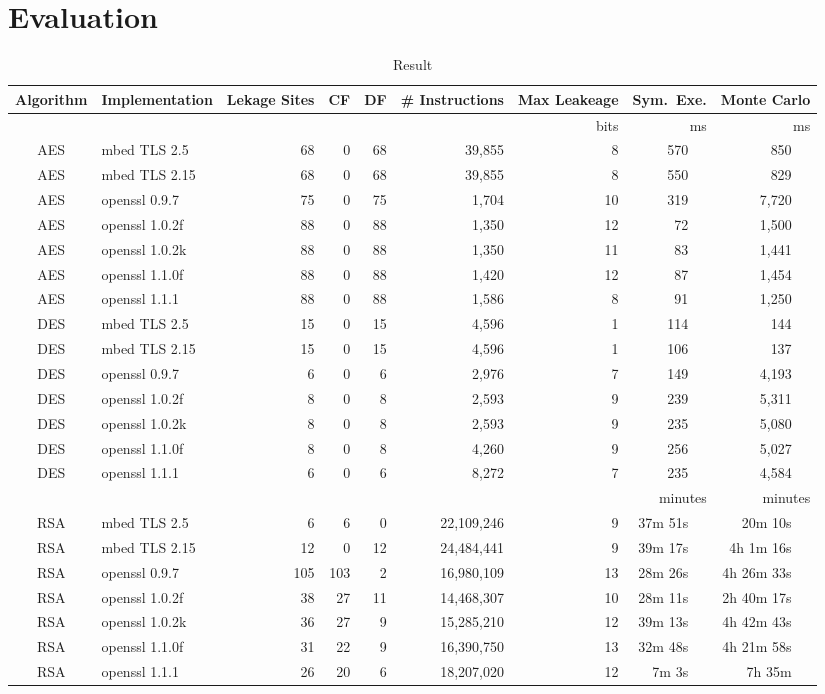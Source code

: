 \section{Evaluation}
\label{res_overview}

\begin{table*}
\centering
\caption{Result}\label{fig:Test}
\begin{tabular}{clrrrrrrr}
\hline
\textbf{Algorithm} & \textbf{Implementation} & \textbf{Lekage Sites} & \textbf{CF} & \textbf{DF}
& \textbf{\# Instructions} & \textbf{Max Leakeage} & \textbf{Sym.\ Exe.} & \textbf{Monte Carlo}\\\hline
&&&&&& bits & ms & ms\\\cline{7-9}
AES & mbed TLS 2.5   & 68 & 0 & 68 & 39,855 & 8 & 570 ~~&   850 ~~\\
AES & mbed TLS 2.15  & 68 & 0 & 68 & 39,855 & 8 & 550 ~~&   829 ~~\\
AES & openssl 0.9.7  & 75 & 0 & 75 & 1,704 & 10 & 319 ~~& 7,720 ~~\\
AES & openssl 1.0.2f & 88 & 0 & 88 & 1,350 & 12 &  72 ~~& 1,500 ~~\\
AES & openssl 1.0.2k & 88 & 0 & 88 & 1,350 & 11 &  83 ~~& 1,441 ~~\\
AES & openssl 1.1.0f & 88 & 0 & 88 & 1,420 & 12 &  87 ~~& 1,454 ~~\\
AES & openssl 1.1.1  & 88 & 0 & 88 & 1,586 & 8 &   91 ~~& 1,250 ~~\\
DES & mbed TLS 2.5   & 15 & 0 & 15 & 4,596 & 1 &  114 ~~&   144 ~~\\
DES & mbed TLS 2.15  & 15 & 0 & 15 & 4,596 & 1 &  106 ~~&   137 ~~\\
DES & openssl 0.9.7  & 6 & 0 & 6 & 2,976 & 7 & 149 ~~& 4,193       ~~\\
DES & openssl 1.0.2f & 8 & 0 & 8 & 2,593 & 9 & 239 ~~& 5,311       ~~\\
DES & openssl 1.0.2k & 8 & 0 & 8 & 2,593 & 9 & 235 ~~& 5,080        ~~\\
DES & openssl 1.1.0f & 8 & 0 & 8 & 4,260 & 9 & 256 ~~& 5,027        ~~\\
DES & openssl 1.1.1  & 6 & 0 & 6 & 8,272 & 7 & 235 ~~& 4,584       ~~\\
&&&&&&& minutes & minutes\\\cline{8-9}
RSA & mbed TLS 2.5   & 6 & 6 & 0 & 22,109,246 & 9      & 37m 51s ~~& 20m 10s ~~\\
RSA & mbed TLS 2.15  & 12 & 0 & 12 & 24,484,441 & 9    & 39m 17s ~~& 4h 1m 16s     ~~\\
RSA & openssl 0.9.7  & 105 & 103 & 2 & 16,980,109 & 13 & 28m 26s ~~& 4h 26m 33s ~~\\
RSA & openssl 1.0.2f & 38 & 27 & 11 & 14,468,307 & 10  & 28m 11s ~~& 2h 40m 17s  ~~\\
RSA & openssl 1.0.2k & 36 & 27 & 9 & 15,285,210 & 12   & 39m 13s ~~& 4h 42m 43s   ~~\\
RSA & openssl 1.1.0f & 31 & 22 & 9 & 16,390,750 & 13   & 32m 48s ~~& 4h 21m 58s   ~~\\
RSA & openssl 1.1.1  & 26 & 20 & 6 & 18,207,020 & 12   &  7m  3s ~~& 7h 35m         ~~\\\hline
\end{tabular}
\end{table*}


